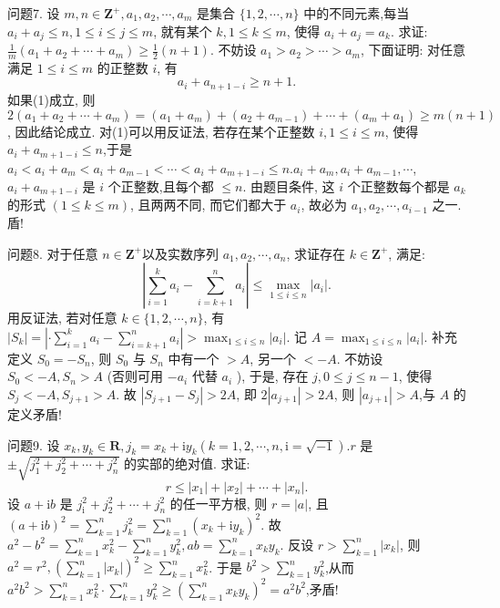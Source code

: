 问题7. 设 $m, n \in \mathbf{Z}^{+}, a_1, a_2, \cdots, a_m$ 是集合 $\{1,2, \cdots, n\}$ 中的不同元素,每当
$a_i+a_j \leqslant n, 1 \leqslant i \leqslant j \leqslant m$, 就有某个 $k, 1 \leqslant k \leqslant m$, 使得 $a_i+a_j=a_k$. 求证: $\frac{1}{m}\left(a_1+a_2+\cdots+a_m\right) \geqslant \frac{1}{2}(n+1)$.
不妨设 $a_1>a_2>\cdots>a_m$, 下面证明: 对任意满足 $1 \leqslant i \leqslant m$ 的正整数 $i$, 有
$$
a_i+a_{n+1-i} \geqslant n+1 . \label{(1)}
$$
如果(1)成立, 则 $2\left(a_1+a_2+\cdots+a_m\right)=\left(a_1+a_m\right)+\left(a_2+a_{m-1}\right)+\cdots+ \left(a_m+a_1\right) \geqslant m(n+1)$, 因此结论成立.
对(1)可以用反证法, 若存在某个正整数 $i, 1 \leqslant i \leqslant m$, 使得 $a_i+a_{m+1-i} \leqslant n$,于是 $a_i<a_i+a_m<a_i+a_{m-1}<\cdots<a_i+a_{m+1-i} \leqslant n . a_i+a_m, a_i+a_{m-1}, \cdots$, $a_i+a_{m+1-i}$ 是 $i$ 个正整数,且每个都 $\leqslant n$. 由题目条件, 这 $i$ 个正整数每个都是 $a_k$ 的形式 $(1 \leqslant k \leqslant m)$, 且两两不同, 而它们都大于 $a_i$, 故必为 $a_1, a_2, \cdots, a_{i-1}$ 之一.
盾!



问题8. 对于任意 $n \in \mathbf{Z}^{+}$以及实数序列 $a_1, a_2, \cdots, a_n$, 求证存在 $k \in \mathbf{Z}^{+}$, 满足:
$$
\left|\sum_{i=1}^k a_i-\sum_{i=k+1}^n a_i\right| \leqslant \max _{1 \leqslant i \leqslant n}\left|a_i\right| .
$$
用反证法, 若对任意 $k \in\{1,2, \cdots, n\}$, 有 $\left|S_k\right|=\left|\cdot \sum_{i=1}^k a_i-\sum_{i=k+1}^n a_i\right|> \max _{1 \leqslant i \leqslant n}\left|a_i\right|$. 记 $A=\max _{1 \leqslant i \leqslant n}\left|a_i\right|$.
补充定义 $S_0=-S_n$, 则 $S_0$ 与 $S_n$ 中有一个 $>A$, 另一个 $<-A$. 不妨设 $S_0<-A, S_n>A$ (否则可用 $-a_i$ 代替 $a_i$ ), 于是, 存在 $j, 0 \leqslant j \leqslant n-1$, 使得 $S_j<-A, S_{j+1}>A$. 故 $\left|S_{j+1}-S_j\right|>2 A$, 即 $2\left|a_{j+1}\right|>2 A$, 则 $\left|a_{j+1}\right|> A$,与 $A$ 的定义矛盾!



问题9. 设 $x_k, y_k \in \mathbf{R}, j_k=x_k+\mathrm{i} y_k(k=1,2, \cdots, n, \mathrm{i}=\sqrt{-1}) . r$ 是 $\pm \sqrt{j_1^2+j_2^2+\cdots+j_n^2}$ 的实部的绝对值.
求证:
$$
r \leqslant\left|x_1\right|+\left|x_2\right|+\cdots+\left|x_n\right| .
$$
设 $a+\mathrm{i} b$ 是 $j_{\mathrm{i}}^2+j_2^2+\cdots+j_n^2$ 的任一平方根, 则 $r=|a|$, 且 $(a+\mathrm{i} b)^2= \sum_{k=1}^n j_k^2=\sum_{k=1}^n\left(x_k+\mathrm{i} y_k\right)^2$.
故 $a^2-b^2=\sum_{k=1}^n x_k^2-\sum_{k=1}^n y_k^2, a b=\sum_{k=1}^n x_k y_k$.
反设 $r>\sum_{k=1}^n\left|x_k\right|$, 则 $a^2=r^2,\left(\sum_{k=1}^n\left|x_k\right|\right)^2 \geqslant \sum_{k=1}^n x_k^2$.
于是 $b^2>\sum_{k=1}^n y_k^2$,从而 $a^2 b^2>\sum_{k=1}^n x_k^2 \cdot \sum_{k=1}^n y_k^2 \geqslant\left(\sum_{k=1}^n x_k y_k\right)^2=a^2 b^2$,矛盾!



